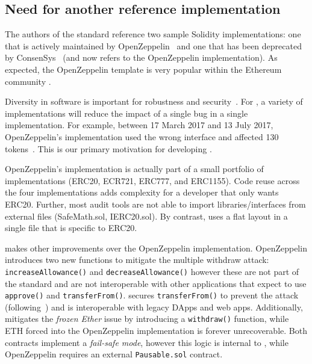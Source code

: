 \subsection{Need for another reference implementation}

The authors of the \erc standard reference two sample Solidity implementations: one that is actively maintained by OpenZeppelin~\cite{OpenZepplin} and one that has been deprecated by ConsenSys~\cite{ConsensysToken} (and now refers to the OpenZeppelin implementation). As expected, the OpenZeppelin template is very popular within the Ethereum community \cite{OPZ1,OPZ2,OPZ3}.

Diversity in software is important for robustness and security~\cite{FSA97,FHS97}. For \erc, a variety of implementations will reduce the impact of a single bug in a single implementation. For example, between 17 March 2017 and 13 July 2017, OpenZeppelin's implementation used the wrong interface and affected 130 tokens~\cite{ErcBug}. This is our primary motivation for developing \sys.

OpenZeppelin's implementation is actually part of a small portfolio of implementations (ERC20, ECR721, ERC777, and ERC1155). Code reuse across the four implementations adds complexity for a developer that only wants ERC20. Further, most audit tools are not able to import libraries/interfaces from external files (\eg SafeMath.sol, IERC20.sol). By contrast, \sys uses a flat layout in a single file that is specific to ERC20.

\sys makes other improvements over the OpenZeppelin implementation. OpenZeppelin introduces two new functions to mitigate the multiple withdraw attack: \texttt{increaseAllowance()} and \texttt{decreaseAllowance()} however these are not part of the \erc standard and are not  interoperable with other applications that expect to use \texttt{approve()} and \texttt{transferFrom()}. \sys secures \texttt{transferFrom()} to prevent the attack (following~\cite{ERC20MWA}) and is interoperable with legacy DApps and web apps. Additionally, \sys mitigates the \textit{frozen Ether} issue by introducing a \texttt{withdraw()} function, while ETH forced into the OpenZeppelin implementation is forever unrecoverable. Both contracts implement a \textit{fail-safe mode}, however this logic is internal to \sys, while OpenZeppelin requires an external \texttt{Pausable.sol} contract.


